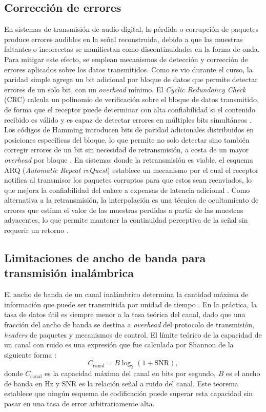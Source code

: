 \subsection{Corrección de errores}

En sistemas de transmisión de audio digital, la pérdida o corrupción de paquetes produce errores audibles en la señal reconstruida, debido a que las muestras faltantes o incorrectas se manifiestan como discontinuidades en la forma de onda.
Para mitigar este efecto, se emplean mecanismos de detección y corrección de errores aplicados sobre los datos transmitidos.
Como se vio durante el curso, la paridad simple agrega un bit adicional por bloque de datos que permite detectar errores de un solo bit, con un \textit{overhead} mínimo.
El \textit{Cyclic Redundancy Check} (CRC) calcula un polinomio de verificación sobre el bloque de datos transmitido, de forma que el receptor puede determinar con alta confiabilidad si el contenido recibido es válido y es capaz de detectar errores en múltiples bits simultáneos \cite{pohlmann2005, tanenbaum2011}.
Los códigos de Hamming introducen bits de paridad adicionales distribuidos en posiciones específicas del bloque, lo que permite no solo detectar sino también corregir errores de un bit sin necesidad de retransmisión, a costa de un mayor \textit{overhead} por bloque \cite{tarres_cabrera_codificacion, haykin2007}.
En sistemas donde la retransmisión es viable, el esquema ARQ (\textit{Automatic Repeat reQuest}) establece un mecanismo por el cual el receptor notifica al transmisor los paquetes corruptos para que estos sean reenviados, lo que mejora la confiabilidad del enlace a expensas de latencia adicional \cite{tanenbaum2011, haykin2007}.
Como alternativa a la retransmisión, la interpolación es una técnica de ocultamiento de errores que estima el valor de las muestras perdidas a partir de las muestras adyacentes, lo que permite mantener la continuidad perceptiva de la señal sin requerir un retorno \cite{tanenbaum2011}.

\subsection{Limitaciones de ancho de banda para transmisión inalámbrica}

El ancho de banda de un canal inalámbrico determina la cantidad máxima de información que puede ser transmitida por unidad de tiempo \cite{pohlmann2005}.
En la práctica, la tasa de datos útil es siempre menor a la tasa teórica del canal, dado que una fracción del ancho de banda se destina a \textit{overhead} del protocolo de transmisión, \textit{headers} de paquetes y mecanismos de control.
El límite teórico de la capacidad de un canal con ruido es una expresión que fue calculada por Shannon de la siguiente forma \cite{tanenbaum2011}:
\begin{equation}
    C_{\text{canal}} = B \log_2\left(1 + \text{SNR}\right),
\end{equation}
donde $C_{\text{canal}}$ es la capacidad máxima del canal en bits por segundo, $B$ es el ancho de banda en \si{\hertz} y SNR es la relación señal a ruido del canal.
Este teorema establece que ningún esquema de codificación puede superar esta capacidad sin pasar en una tasa de error arbitrariamente alta.

